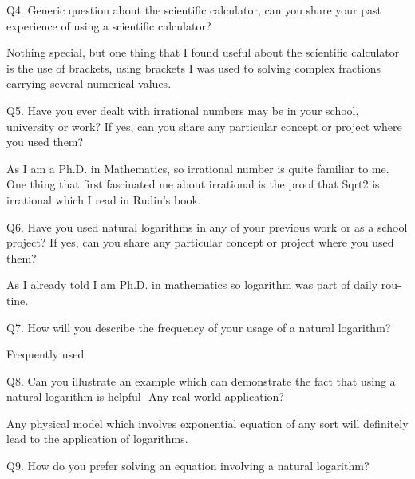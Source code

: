 \documentclass[12pt]{article}
\begin{document}
\vspace{\baselineskip}
Q4. Generic question about the scientific calculator, can you share your past experience of using a scientific calculator?\par

Nothing special, but one thing that I found useful about the scientific calculator is the use of brackets, using brackets I was used to solving complex fractions carrying several numerical values.\par


\vspace{\baselineskip}
Q5. Have you ever dealt with irrational numbers may be in your school, university or work? If yes, can you share any particular concept or project where you used them?\par

As I am a Ph.D. in Mathematics, so irrational number is quite familiar to me. One thing that first fascinated me about irrational is the proof that Sqrt2 is irrational which I read in Rudin’s book.\par


\vspace{\baselineskip}
Q6. Have you used natural logarithms in any of your previous work or as a school project? If yes, can you share any particular concept or project where you used them?\par

As I already told I am Ph.D. in mathematics so logarithm was part of daily rou- tine.\par


\vspace{\baselineskip}
Q7. How will you describe the frequency of your usage of a natural logarithm?\par

Frequently used\par


\vspace{\baselineskip}
Q8. Can you illustrate an example which can demonstrate the fact that using a natural logarithm is helpful- Any real-world application?\par

Any physical model which involves exponential equation of any sort will definitely lead to the application of logarithms.\par


\vspace{\baselineskip}
Q9. How do you prefer solving an equation involving a natural logarithm?\par
\end{document}
